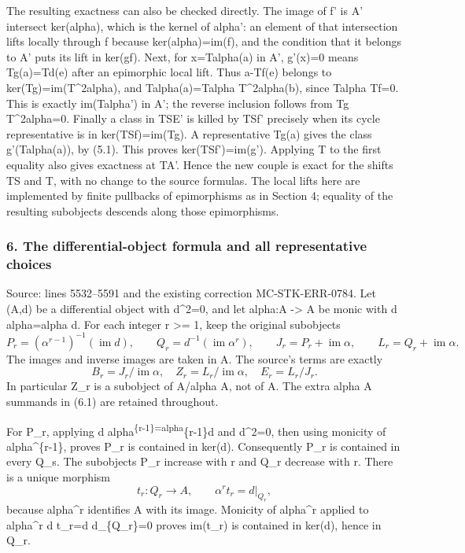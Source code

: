 \documentclass[11pt]{article}
\begin{document}
The resulting exactness can also be checked directly. The image of f' is A' intersect ker(alpha), which is the kernel of alpha': an element of that intersection lifts locally through f because ker(alpha)=im(f), and the condition that it belongs to A' puts its lift in ker(gf). Next, for x=Talpha(a) in A', g'(x)=0 means Tg(a)=Td(e) after an epimorphic local lift. Thus a-Tf(e) belongs to ker(Tg)=im(T\^{}2alpha), and Talpha(a)=Talpha T\^{}2alpha(b), since Talpha Tf=0. This is exactly im(Talpha') in A'; the reverse inclusion follows from Tg T\^{}2alpha=0. Finally a class in TSE' is killed by TSf' precisely when its cycle representative is in ker(TSf)=im(Tg). A representative Tg(a) gives the class g'(Talpha(a)), by (5.1). This proves ker(TSf')=im(g'). Applying T to the first equality also gives exactness at TA'. Hence the new couple is exact for the shifts TS and T, with no change to the source formulas. The local lifts here are implemented by finite pullbacks of epimorphisms as in Section 4; equality of the resulting subobjects descends along those epimorphisms.

\subsubsection{6. The differential-object formula and all representative choices}\label{the-differential-object-formula-and-all-representative-choices}

Source: lines 5532--5591 and the existing correction MC-STK-ERR-0784. Let (A,d) be a differential object with d\^{}2=0, and let alpha:A -\textgreater{} A be monic with d alpha=alpha d. For each integer r \textgreater= 1, keep the original subobjects \[
P_r=(\alpha^{r-1})^{-1}(\operatorname{im}d),\qquad
Q_r=d^{-1}(\operatorname{im}\alpha^r),\qquad
J_r=P_r+\operatorname{im}\alpha,\qquad
L_r=Q_r+\operatorname{im}\alpha.                           \tag{6.1}
\] The images and inverse images are taken in A. The source's terms are exactly \[
B_r=J_r/\operatorname{im}\alpha,\quad
Z_r=L_r/\operatorname{im}\alpha,\quad
E_r=L_r/J_r.                                             \tag{6.2}
\] In particular Z\_r is a subobject of A/alpha A, not of A. The extra alpha A summands in (6.1) are retained throughout.

For P\_r, applying d alpha\textsuperscript{\{r-1\}=alpha}\{r-1\}d and d\^{}2=0, then using monicity of alpha\^{}\{r-1\}, proves P\_r is contained in ker(d). Consequently P\_r is contained in every Q\_s. The subobjects P\_r increase with r and Q\_r decrease with r. There is a unique morphism \[
t_r:Q_r\longrightarrow A,\qquad
\alpha^r t_r=d|_{Q_r},                                   \tag{6.3}
\] because alpha\^{}r identifies A with its image. Monicity of alpha\^{}r applied to alpha\^{}r d t\_r=d d\textbar\_\{Q\_r\}=0 proves im(t\_r) is contained in ker(d), hence in Q\_r.
\end{document}
